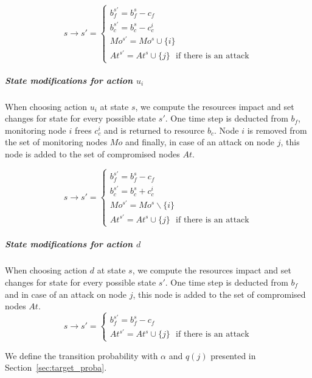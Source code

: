 \begin{equation}
  s \longrightarrow s' =\begin{cases}
    b_f^{s'} = b_f^s - c_f\\
    b_c^{s'} = b_c^s - c_c^i\\
    Mo^{s'} = Mo^s \cup \{i\}\\
    At^{s'} = At^s \cup \{j\} \text{~~if there is an attack}
  \end{cases}
\end{equation}

\subparagraph*{\textbf{State modifications for action $u_i$}}
When choosing action $u_i$ at state $s$, we compute the resources impact and set changes for state for every possible state $s'$. One time step is deducted from $b_f$, monitoring node $i$ frees $c_c^i$ and is returned to resource $b_c$. Node $i$ is removed from the set of monitoring nodes $Mo$ and finally, in case of an attack on node $j$, this node is added to the set of compromised nodes $At$.

\begin{equation}
  s \longrightarrow s' =\begin{cases}
    b_f^{s'} = b_f^s - c_f\\
    b_c^{s'} = b_c^s + c_c^i\\
    Mo^{s'} = Mo^s \backslash\{i\}\\
    At^{s'} = At^s \cup \{j\}\text{~~if there is an attack}
  \end{cases}
\end{equation}

\subparagraph*{\textbf{State modifications for action $d$}}
When choosing action $d$ at state $s$, we compute the resources impact and set changes for state for every possible state $s'$. One time step is deducted from $b_f$ and in case of an attack on node $j$, this node is added to the set of compromised nodes $At$.
\begin{equation}
  s \longrightarrow s' =\begin{cases}
    b_f^{s'} = b_f^s - c_f\\
    At^{s'} = At^s \cup \{j\}\text{~~if there is an attack}
  \end{cases}
\end{equation}


We define the transition probability with $\alpha$ and $q(j)$ presented in Section~\ref{sec:target_proba}.


